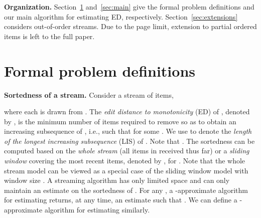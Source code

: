 \documentclass{llncs}
\newcommand{\comment}[1]{}
\newcommand{\runtitle}[1]{{\small \textbf{\boldmath #1}}}
\begin{document}
\comment{
\runtitle{Techniques.}
For the problem of estimating ED in the whole data stream, existing algorithms try to identify a
subset of ``bad'' items, who has a significant effect on the sortedness of the stream.
At the same time, the
size of the subset is a good approximation to the actual ED of the stream.  Therefore, the algorithm
only need to maintain a counter for the number of ``bad'' items, which will never decrease.  However,
for the sliding window version of this problem, as the window slides, ``bad'' items may eventually
become ordinary items even if they have not expired themselves. So one counter will not
work in this case.  We
deal with this situation by modeling those ``bad'' items as an out-of-order substream.  By employing
a basic counting structure for out-of-order streams, the size of the ``bad'' subset can be estimated
dynamically.

For lower bounds in out-of-order streams, we use different methods for ED and LIS.  For
ED, we construct a large set of input streams such that a correct
algorithm needs to differentiate any two of them (i.e. different memory states). Therefore, the
algorithm needs to use space the logarithm of the total number of input streams.  On the other hand,
we prove the lower bound for LIS through a reduction from a communication
problem, whose communication lower bound is known.  Both bounds are deterministic and linear in the
size of the stream for constant approximation.
}

\runtitle{Organization.}
Section~\ref{sec:definitions} and~\ref{sec:main} give the formal problem definitions
and our main algorithm for
estimating ED, respectively.
Section~\ref{sec:extensions} considers out-of-order streams.
Due to the page limit, extension to
partial ordered items is left to the full paper.


\section{Formal problem definitions}\label{sec:definitions}

\runtitle{Sortedness of a stream.}
Consider a stream  of  items,

where each  is drawn
from .
The \emph{edit distance to monotonicity} (ED) of ,
denoted by ,
is the minimum number of items required
to remove so as to obtain an increasing subsequence of ,
i.e., 
such that 
for some .
We use  to denote the
\emph{length of the longest increasing subsequence} (LIS) of .
Note that .
The sortedness can be computed based
on the \emph{whole stream} (all items in  received thus far)
or a \emph{sliding window} covering the most recent  items,
denoted by , for .
Note that the whole stream model can be viewed as
a special case of the sliding window model with window size .
A streaming algorithm has only limited space
and can only maintain an estimate on
the sortedness of .
For any ,
a -approximate algorithm for estimating 
returns, at any time,
an estimate 
such that .
We can define a -approximate algorithm
for estimating  similarly.
\end{document}

